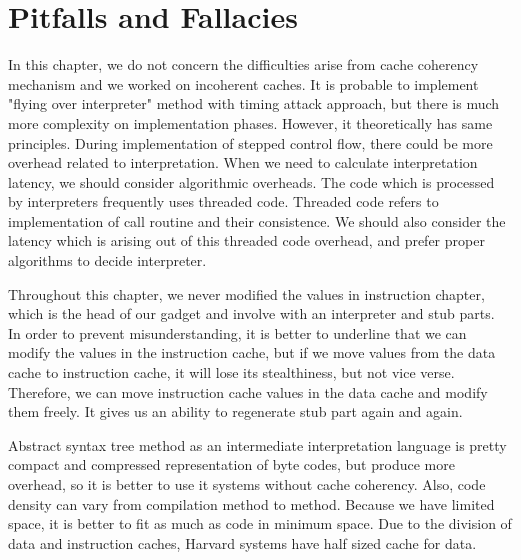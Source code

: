 \section{Pitfalls and Fallacies}
	In this chapter, we do not concern the difficulties arise from cache coherency mechanism and we worked on incoherent caches. It is probable to implement "flying over interpreter" method with timing attack approach, but there is much more complexity on implementation phases. However, it theoretically has same principles. During implementation of stepped control flow, there could be more overhead related to interpretation. When we need to calculate interpretation latency, we should consider algorithmic overheads. The code which is processed by interpreters frequently uses threaded code. Threaded code refers to implementation of call routine and their consistence. We should also consider the latency which is arising out of this threaded code overhead, and prefer proper algorithms to decide interpreter. 

	Throughout this chapter, we never modified the values in instruction chapter, which is the head of our gadget and involve with an interpreter and stub parts. In order to prevent misunderstanding, it is better to underline that we can modify the values in the instruction cache, but if we move values from the data cache to instruction cache, it will lose its stealthiness, but not vice verse. Therefore, we can move instruction cache values in the data cache and modify them freely. It gives us an ability to regenerate stub part again and again.

	Abstract syntax tree method as an intermediate interpretation language is pretty compact and compressed representation of byte codes\cite{kistler1999tree}, but produce more overhead\cite{garen2008announcing}, so it is better to use it systems without cache coherency. Also, code density can vary from compilation method to method. Because we have limited space, it is better to fit as much as code in minimum space. Due to the division of data and instruction caches, Harvard systems have half sized cache for data.